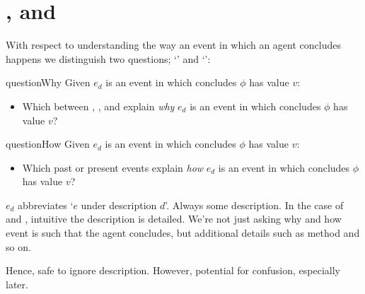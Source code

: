 \section*{\qWhy{}, \qHow{} and \issueInclusion{}}
\label{cha:intro:why-how}

\begin{note}
  With respect to understanding the way an event in which an agent concludes happens we distinguish two questions; `\qWhy{}' and `\qHow{}':

  \begin{question}{questionWhy}{\qWhy{}}
    Given \(e_{d}\) is an event in which \vAgent{} concludes \(\phi\) has value \(v\):
    \begin{itemize}
    \item
      Which \ros{} between , , and  explain \emph{why} \(e_{d}\) is an event in which \vAgent{} concludes \(\phi\) has value \(v\)?
    \end{itemize}
    \vspace{-1.5\baselineskip}
  \end{question}

  \begin{question}{questionHow}{\qHow{}}
    \label{q:how}
    Given \(e_{d}\) is an event in which \vAgent{} concludes \(\phi\) has value \(v\):
    \begin{itemize}
    \item
      Which past or present events explain \emph{how} \(e_{d}\) is an event in which \vAgent{} concludes \(\phi\) has value \(v\)?
    \end{itemize}
    \vspace{-1.5\baselineskip}
  \end{question}
\end{note}

\begin{note}
  \color{red}
  \(e_{d}\) abbreviates `\(e\) under description \(d\)'.
  Always some description.
  In the case of \qWhy{} and \qHow{}, intuitive the description is detailed.
  We're not just asking why and how event is such that the agent concludes, but additional details such as method and so on.

  Hence, safe to ignore description.
  However, potential for confusion, especially later.
\end{note}

